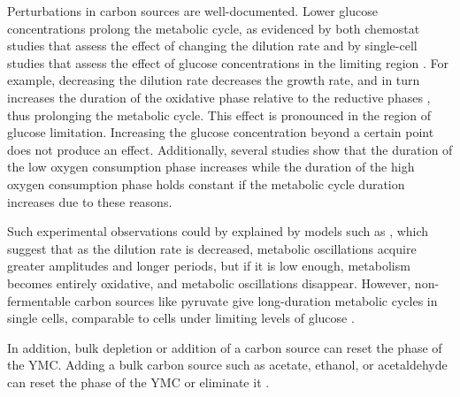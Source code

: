 Perturbations in carbon sources are well-documented.
Lower glucose concentrations prolong the metabolic cycle, as evidenced by both chemostat studies that assess the effect of changing the dilution rate \parencite{burnettiCellCycleStart2016, oneillEukaryoticCellBiology2020} and by single-cell studies that assess the effect of glucose concentrations in the limiting region \parencite{papagiannakisAutonomousMetabolicOscillations2017}.
For example, decreasing the dilution rate decreases the growth rate, and in turn increases the duration of the oxidative phase relative to the reductive phases \parencite{slavovCouplingGrowthRate2011}, thus prolonging the metabolic cycle.
This effect is pronounced in the region of glucose limitation.
Increasing the glucose concentration beyond a certain point does not produce an effect.
Additionally, several studies \parencite{slavovCouplingGrowthRate2011,oneillEukaryoticCellBiology2020} show that the duration of the low oxygen consumption phase increases while the duration of the high oxygen consumption phase holds constant if the metabolic cycle duration increases due to these reasons.

Such experimental observations could by explained by models such as \textcite{jonesCyberneticModelGrowth1999}, which suggest that as the dilution rate is decreased, metabolic oscillations acquire greater amplitudes and longer periods, but if it is low enough, metabolism becomes entirely oxidative, and metabolic oscillations disappear.
However, non-fermentable carbon sources like pyruvate give long-duration metabolic cycles in single cells, comparable to cells under limiting levels of glucose \parencite{papagiannakisAutonomousMetabolicOscillations2017}.

In addition, bulk depletion or addition of a carbon source can reset the phase of the YMC\@.
Adding a bulk carbon source such as acetate, ethanol, or acetaldehyde can reset the phase of the YMC \parencite{kuangMsn2RegulateExpression2017, krishnaMinimalPushPull2018} or eliminate it \parencite{jonesCyberneticModelGrowth1999}.

